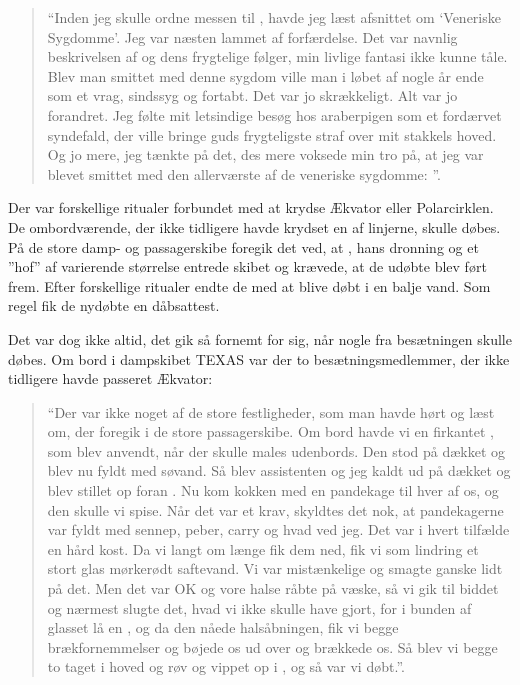 \begin{quote}

    ``Inden jeg skulle ordne messen til , havde jeg læst
    afsnittet om `Veneriske Sygdomme'. Jeg var næsten lammet af
    forfærdelse. Det var navnlig beskrivelsen af  og dens
    frygtelige følger, min livlige fantasi ikke kunne tåle. Blev man
    smittet med denne sygdom ville man i løbet af nogle år ende som et
    vrag, sindssyg og fortabt. Det var jo skrækkeligt. Alt var jo
    forandret. Jeg følte mit letsindige besøg hos araberpigen som et
    fordærvet syndefald, der ville bringe guds frygteligste straf over
    mit stakkels hoved. Og jo mere, jeg tænkte på det, des mere voksede
    min tro på, at jeg var blevet smittet med den allerværste af de
    veneriske sygdomme: ''.
    
\end{quote}

Der var forskellige ritualer forbundet med at krydse Ækvator eller
Polarcirklen. De ombordværende, der ikke tidligere havde krydset en af
linjerne, skulle døbes. På de store damp- og passagerskibe foregik det
ved, at , hans dronning og et ''hof'' af
varierende størrelse entrede skibet og krævede, at de udøbte blev ført
frem. Efter forskellige ritualer endte de med at blive døbt i en balje
vand. Som regel fik de nydøbte en dåbsattest. 

Det var dog ikke altid, det gik så
fornemt for sig, når nogle fra besætningen skulle døbes. Om bord i
dampskibet TEXAS var der to besætningsmedlemmer, der ikke tidligere
havde passeret Ækvator: 

\begin{quote}
    
    ``Der var ikke noget af de store festligheder, som man havde hørt og
    læst om, der foregik i de store passagerskibe. Om bord havde vi en
    firkantet , som blev anvendt, når der skulle males
    udenbords.  Den stod på dækket og blev nu fyldt med søvand. Så blev
    assistenten og jeg kaldt ud på dækket og blev stillet op foran
    .  Nu kom kokken med en pandekage til hver af os, og
    den skulle vi spise.  Når det var et krav, skyldtes det nok, at
    pandekagerne var fyldt med sennep, peber, carry og hvad ved jeg. Det
    var i hvert tilfælde en hård kost. Da vi langt om længe fik dem ned,
    fik vi som lindring et stort glas mørkerødt saftevand. Vi var
    mistænkelige og smagte ganske lidt på det. Men det var OK og vore
    halse råbte på væske, så vi gik til biddet og nærmest slugte det,
    hvad vi ikke skulle have gjort, for i bunden af glasset lå en
    , og da den nåede halsåbningen, fik vi begge
    brækfornemmelser og bøjede os ud over  og brækkede os.
    Så blev vi begge to taget i hoved og røv og vippet op i
    , og så var vi døbt.''.

\end{quote}

